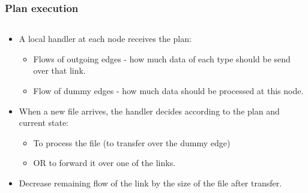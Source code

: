 \documentclass{beamer}
\begin{document}
\begin{frame}\frametitle{Plan execution}

\begin{columns}[c] %

\begin{block}{}
\begin{itemize}
\item A local handler at each node receives the plan:

\begin{itemize}
\footnotesize
\item Flows of outgoing edges - how much data of each type should be send over that link.
\item Flow of dummy edges - how much data should be processed at this node.
 \end{itemize}

\item When a new file arrives, the handler decides according to the plan and current state:

\begin{itemize}
\footnotesize
 \item To process the file (to transfer over the dummy edge)
 \item OR to forward it over one of the links.  
 \end{itemize}
 \item Decrease remaining flow of the link by the size of the file after transfer.
\end{itemize}
\end{block}    



\end{columns}
\end{frame}
\end{document}
